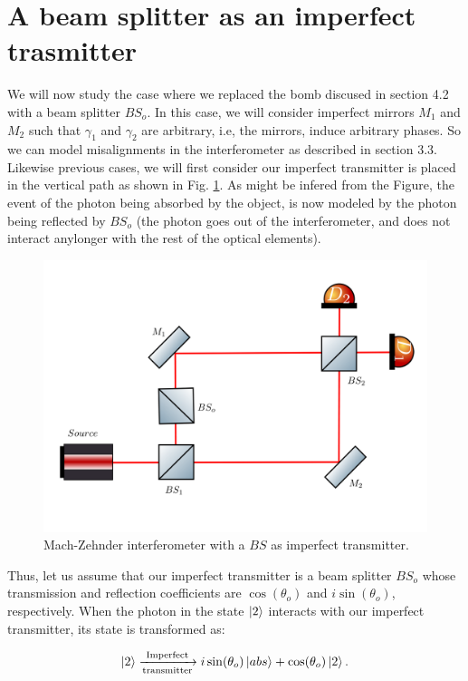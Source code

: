 \documentclass[12pt]{book}
\begin{document}
\section{A beam splitter as an imperfect trasmitter}

We will now study the case where we replaced the bomb discused in section 4.2 with a beam splitter $BS_{o}$. In this case, we will consider imperfect mirrors $M_{1}$ and $M_{2}$ such that $\gamma_{1}$ and $\gamma_{2}$ are arbitrary, i.e, the mirrors, induce arbitrary phases. So we can model misalignments in the interferometer as described in section 3.3.  Likewise  previous cases, we will first consider our imperfect transmitter is placed in the vertical path as shown in Fig. \ref{bs vertical}. As might be infered from the Figure, the event of the photon being absorbed by the object, is now modeled by the photon being reflected by $BS_{o}$ (the photon goes out of the interferometer, and does not interact anylonger with the rest of the optical elements).



\begin{figure}[t!]
\centering
\includegraphics[width=\linewidth,height=7.5 cm]{images/machzenhderbs.png}
\caption{Mach-Zehnder interferometer with a $BS$ as imperfect transmitter.}
\label{bs vertical}
\end{figure}

Thus, let us assume that our imperfect transmitter is a beam splitter $BS_{o}$ whose transmission and reflection coefficients are $\cos(\theta_{o})$ and $i\sin(\theta_{o})$, respectively. When the photon in the state $\ket{2}$ interacts with our imperfect transmitter, its state is transformed as:

\begin{align}
\ket{2}\xrightarrow[\text{transmitter}]{\text{Imperfect}}i\sin(\theta_{o}) \ket{abs} +\cos(\theta_{o}) \ket{2}.
\end{align}
\end{document}
